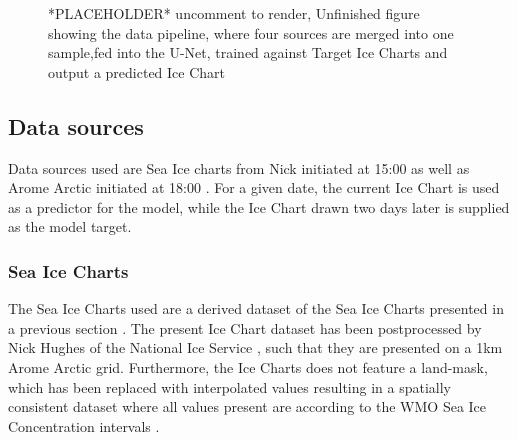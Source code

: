 \documentclass[../main/thesis.tex]{subfiles}
\begin{document}
\begin{figure}
{
    }
    \fi
    \caption{\label{fig:pipeline}*PLACEHOLDER* uncomment to render, Unfinished figure showing the data pipeline, where four sources are merged into one sample,fed into the U-Net, trained against Target Ice Charts and output a predicted Ice Chart}
\end{figure}


\subsection{Data sources}
Data sources used are Sea Ice charts from Nick initiated at 15:00 as well as Arome Arctic initiated at 18:00 \cite{MOI2015,Mueller2017}. For a given date, the current Ice Chart is used as a predictor for the model, while the Ice Chart drawn two days later is supplied as the model target.

\subsubsection{Sea Ice Charts}
The Sea Ice Charts used are a derived dataset of the Sea Ice Charts presented in a previous section . The present Ice Chart dataset has been postprocessed by Nick Hughes of the National Ice Service , such that they are presented on a 1km Arome Arctic grid. Furthermore, the Ice Charts does not feature a land-mask, which has been replaced with interpolated values resulting in a spatially consistent dataset where all values present are according to the WMO Sea Ice Concentration intervals \cite{JETSI2014}. 
\end{document}
